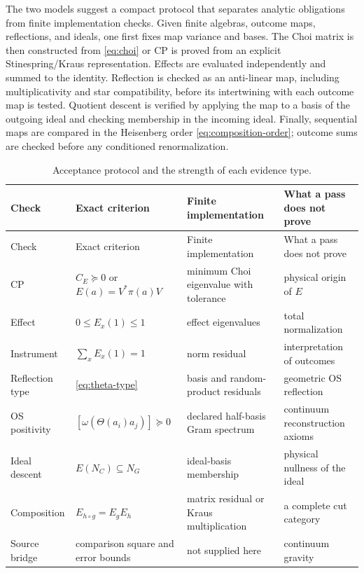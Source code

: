 \documentclass[11pt,a4paper]{article}
\theoremstyle{definition}
\theoremstyle{remark}
\begin{document}
The two models suggest a compact protocol that separates analytic obligations from
finite implementation checks.  Given finite algebras, outcome maps, reflections, and
ideals, one first fixes map variance and bases.  The Choi matrix is then constructed
from \eqref{eq:choi} or CP is proved from an explicit Stinespring/Kraus representation.
Effects are evaluated independently and summed to the identity.  Reflection is checked
as an anti-linear map, including multiplicativity and star compatibility, before its
intertwining with each outcome map is tested.  Quotient descent is verified by applying
the map to a basis of the outgoing ideal and checking membership in the incoming ideal.
Finally, sequential maps are compared in the Heisenberg order
\eqref{eq:composition-order}; outcome sums are checked before any conditioned
renormalization.

\small
\begin{longtable}{@{}p{}p{}p{}p{}@{}}
\caption{Acceptance protocol and the strength of each evidence type.}
\label{tab:protocol}\\
\toprule
Check & Exact criterion & Finite implementation & What a pass does not prove\\
\midrule
\endfirsthead
\toprule
Check & Exact criterion & Finite implementation & What a pass does not prove\\
\midrule
\endhead
CP & $C_E\succeq0$ or $E(a)=V^*\pi(a)V$ & minimum Choi eigenvalue with tolerance & physical origin of $E$\\
Effect & $0\leq E_x(1)\leq1$ & effect eigenvalues & total normalization\\
Instrument & $\sum_xE_x(1)=1$ & norm residual & interpretation of outcomes\\
Reflection type & \eqref{eq:theta-type} & basis and random-product residuals & geometric OS reflection\\
OS positivity & $[\omega(\Theta(a_i)a_j)]\succeq0$ & declared half-basis Gram spectrum & continuum reconstruction axioms\\
Ideal descent & $E(N_C)\subseteq N_G$ & ideal-basis membership & physical nullness of the ideal\\
Composition & $E_{h\circ g}=E_gE_h$ & matrix residual or Kraus multiplication & a complete cut category\\
Source bridge & comparison square and error bounds & not supplied here & continuum gravity\\
\bottomrule
\end{longtable}
\normalsize
\end{document}
